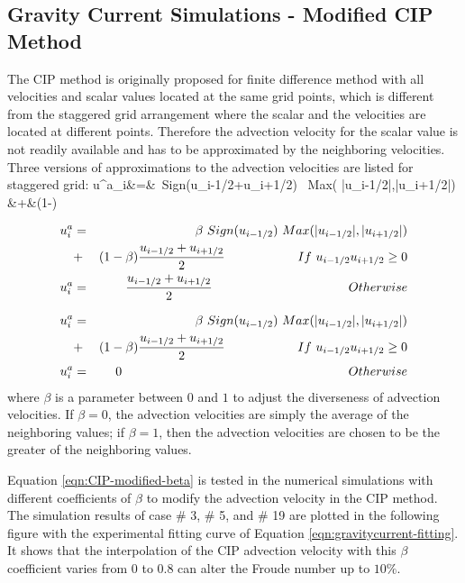 \normalsize
\subsection{Gravity Current Simulations - Modified CIP Method}
\label{MCIP}

The CIP method is originally proposed for finite difference method with all velocities and scalar values located at the same grid points, which is different from the staggered grid arrangement where the scalar and the velocities are located at different points. Therefore the advection velocity for the scalar value is not readily available and has to be approximated by the neighboring velocities. Three versions of approximations to the advection velocities are listed for staggered grid:
\ba
u^a_{i}&=&\beta \ Sign(u_{i-1/2}+u_{i+1/2}) \ Max( |u_{i-1/2}|,|u_{i+1/2}|)\nn \\
&+&(1-\beta) 
\ea

\begin{eqnarray}
u^a_{i}&=&
\beta \ Sign(u_{i-1/2})\ Max( |u_{i-1/2}|,|u_{i+1/2}|) \nonumber \\
&+& (1-\beta) \frac{u_{i-1/2}+u_{i+1/2}}{2}
\hspace{0.8in}  If \ u_{i-1/2}u_{i+1/2} \geq 0 \nonumber \\
u^a_{i}&=& \frac{u_{i-1/2}+u_{i+1/2}}{2} \hspace{1.5in} Otherwise
\end{eqnarray}

\begin{eqnarray}
u^a_{i}&=&
\beta \ Sign(u_{i-1/2})\ Max( |u_{i-1/2}|,|u_{i+1/2}|) \nonumber \\
&+& (1-\beta) \frac{u_{i-1/2}+u_{i+1/2}}{2}
\hspace{0.8in}  If \ u_{i-1/2}u_{i+1/2} \geq 0 \nonumber \\
u^a_{i}&=& 0 \hspace{2.5in} Otherwise
\label{eqn:CIP-modified-beta}
\end{eqnarray}
where $\beta$ is a parameter between $0$ and $1$ to adjust the diverseness of advection velocities. If $\beta = 0$, the advection velocities are simply the average of the neighboring values; if $\beta = 1$, then the advection velocities are chosen to be the greater of the neighboring values.

Equation \ref{eqn:CIP-modified-beta} is tested in the numerical simulations with different coefficients of $\beta$ to modify the advection velocity in the CIP method. The simulation results of case \# 3, \# 5, and \# 19 are plotted in the following figure with the experimental fitting curve of Equation \ref{eqn:gravitycurrent-fitting}. It shows that the interpolation of the CIP advection velocity with this $\beta$ coefficient varies from 0 to 0.8 can alter the Froude number up to $10\%$.

